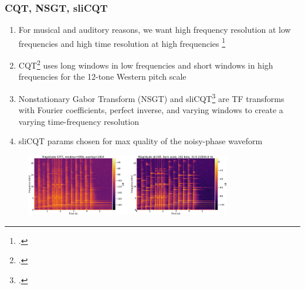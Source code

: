 \documentclass[usenames,dvipsnames]{beamer}
\begin{document}
\begin{frame}
	\frametitle{CQT, NSGT, sliCQT}
	\begin{enumerate}
	\item
		For musical and auditory reasons, we want high frequency resolution at low frequencies and high time resolution at high frequencies \footcite{doerflerphd}
	\item
		CQT\footcite{jbrown} uses long windows in low frequencies and short windows in high frequencies for the 12-tone Western pitch scale
	\item
		Nonstationary Gabor Transform (NSGT) and sliCQT\footcite{balazs, slicq} are TF transforms with Fourier coefficients, perfect inverse, and varying windows to create a varying time-frequency resolution
	\item
		sliCQT params chosen for max quality of the noisy-phase waveform
	\end{enumerate}
	\begin{figure}[ht]
		\centering
		\vspace{-0.5em}
		\includegraphics[height=2.7cm]{./images-mila-presentation/spectrograms_comparison.png}
	\end{figure}
\end{frame}
\end{document}
